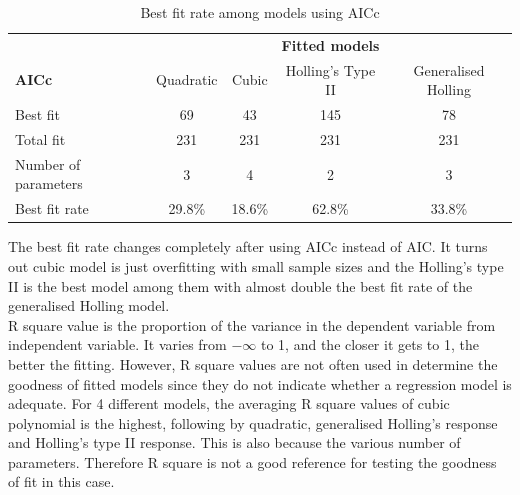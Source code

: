 \documentclass{article}[11pt,a4,twosided,doublespacing,titlepagenumber=on,numbers=endperiod]
\begin{document}
\begin{table}[H]
\centering 
\begin{tabular}{l c c c c}
\toprule %
& \multicolumn{4}{c}{\textbf{Fitted models}} \\
\cmidrule(l){2-5}
\textbf{AICc} & Quadratic & Cubic & Holling's Type II & Generalised Holling\\ %
\midrule %
Best fit & 69 & 43 & 145 & 78\\ %
Total fit  & 231 & 231 & 231 & 231\\ %
Number of parameters & 3 & 4 & 2 & 3\\ %
\midrule %
\midrule %
Best fit rate & 29.8\% & 18.6\% & 62.8\% & 33.8\% \\ %
\bottomrule %
\end{tabular}
\caption{Best fit rate among models using AICc} %
\label{tab:template} %
\end{table}
\noindent
The best fit rate changes completely after using AICc instead of AIC. It turns out cubic model is just overfitting with small sample sizes and the Holling's type II is the best model among them with almost double the best fit rate of the generalised Holling model. \\
\noindent
R square value is the proportion of the variance in the dependent variable from independent variable. It varies from $-\infty$ to 1, and the closer it gets to 1, the better the fitting. However, R square values are not often used in determine the goodness of fitted models since they do not indicate whether a regression model is adequate. For 4 different models, the averaging R square values of cubic polynomial is the highest, following by quadratic, generalised Holling's response and Holling's type II response. This is also because the various number of parameters. Therefore R square is not a good reference for testing the goodness of fit in this case. \\
\noindent
\end{document}
